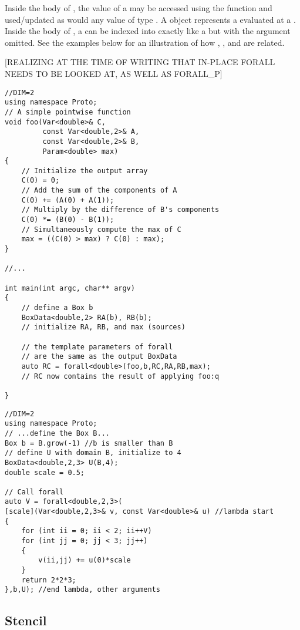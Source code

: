 \documentclass[12pt]{article}
\begin{document}
Inside the body of , the value of a  may be accessed using the  function and used/updated as would any value of type . A  object represents a  evaluated at a . Inside the body of , a  can be indexed into exactly like a  but with the  argument omitted. See the examples below for an illustration of how , ,  and  are related. 

[REALIZING AT THE TIME OF WRITING THAT IN-PLACE FORALL NEEDS TO BE LOOKED AT, AS WELL AS FORALL\_P]

\begin{lstlisting}[caption=Forall Usage with External Function, label=lst-forall-foo]
//DIM=2
using namespace Proto;
// A simple pointwise function
void foo(Var<double>& C,
		 const Var<double,2>& A,
	     const Var<double,2>& B,
		 Param<double> max)
{
	// Initialize the output array
	C(0) = 0;
	// Add the sum of the components of A
	C(0) += (A(0) + A(1));
	// Multiply by the difference of B's components
	C(0) *= (B(0) - B(1));
	// Simultaneously compute the max of C
	max = ((C(0) > max) ? C(0) : max);
}

//...

int main(int argc, char** argv)
{
	// define a Box b
	BoxData<double,2> RA(b), RB(b);
	// initialize RA, RB, and max (sources)
	
	// the template parameters of forall
	// are the same as the output BoxData
	auto RC = forall<double>(foo,b,RC,RA,RB,max);
	// RC now contains the result of applying foo:q

}
\end{lstlisting}

\begin{lstlisting}[caption=Forall Usage With Lambda, label=lst-forall-lambda]
//DIM=2
using namespace Proto;
// ...define the Box B...
Box b = B.grow(-1) //b is smaller than B
// define U with domain B, initialize to 4
BoxData<double,2,3> U(B,4);
double scale = 0.5;

// Call forall
auto V = forall<double,2,3>(
[scale](Var<double,2,3>& v, const Var<double>& u) //lambda start
{
	for (int ii = 0; ii < 2; ii++V)
	for (int jj = 0; jj < 3; jj++)
	{
		v(ii,jj) += u(0)*scale
	}
	return 2*2*3;
},b,U); //end lambda, other arguments

\end{lstlisting}

\subsection{Stencil}
\end{document}
